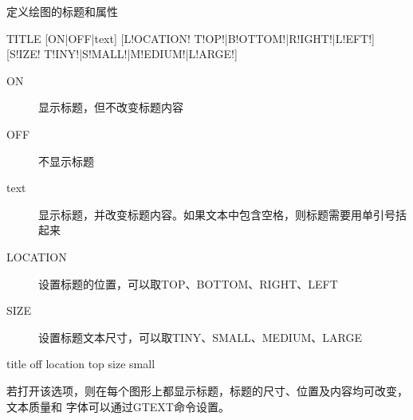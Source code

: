 \label{cmd:title}

定义绘图的标题和属性

\begin{SACSTX}
TITLE [ON|OFF|text] [L!OCATION! T!OP!|B!OTTOM!|R!IGHT!|L!EFT!] 
    [S!IZE! T!INY!|S!MALL!|M!EDIUM!|L!ARGE!]
\end{SACSTX}

\begin{description}
\item [ON] 显示标题，但不改变标题内容
\item [OFF] 不显示标题
\item [text] 显示标题，并改变标题内容。如果文本中包含空格，则标题需要用单引号括起来
\item [LOCATION] 设置标题的位置，可以取TOP、BOTTOM、RIGHT、LEFT
\item [SIZE] 设置标题文本尺寸，可以取TINY、SMALL、MEDIUM、LARGE 
\end{description}

\begin{SACDFT}
title off location top size small
\end{SACDFT}

若打开该选项，则在每个图形上都显示标题，标题的尺寸、位置及内容均可改变，文本质量和
字体可以通过GTEXT命令设置。

